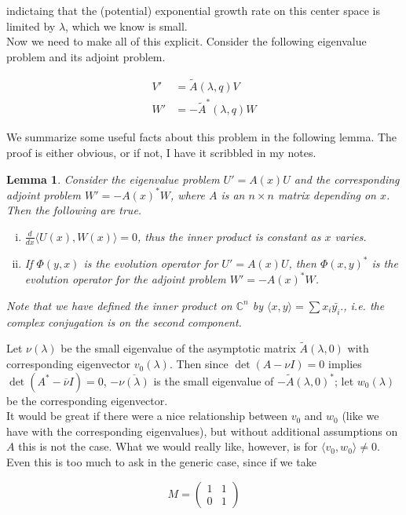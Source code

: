 \documentclass[12pt]{article}
\def\C{{\mathbb C}}
\newtheorem{lemma}{Lemma}
\begin{document}
indictaing that the (potential) exponential growth rate on this center space is limited by $\lambda$, which we know is small.\\

Now we need to make all of this explicit. Consider the following eigenvalue problem and its adjoint problem.

\begin{align}
V' &= \tilde{A}(\lambda, q)V \label{eig:V} \\
W' &= -\tilde{A}^*(\lambda, q)W \label{eig:W}
\end{align}

We summarize some useful facts about this problem in the following lemma. The proof is either obvious, or if not, I have it scribbled in my notes.

\begin{lemma}\label{eigadjoint}
Consider the eigenvalue problem $U' = A(x)U$ and the corresponding adjoint problem $W' = -A(x)^* W$, where $A$ is an $n \times n$ matrix depending on $x$. Then the following are true.
\begin{enumerate}[(i)]
\item $\frac{d}{dx}\langle U(x), W(x) \rangle = 0$, thus the inner product is constant as $x$ varies.
\item If $\Phi(y, x)$ is the evolution operator for $U' = A(x)U$, then $\Phi(x, y)^*$ is the evolution operator for the adjoint problem $W' = -A(x)^* W$.
\end{enumerate}
Note that we have defined the inner product on $\C^n$ by $\langle x, y \rangle = \sum x_i \bar{y_i}.$, i.e. the complex conjugation is on the second component.
\end{lemma}

Let $\nu(\lambda)$ be the small eigenvalue of the asymptotic matrix $\tilde{A}(\lambda,0)$ with corresponding eigenvector $v_0(\lambda)$. Then since $\det(A - \nu I) = 0$ implies $\det(A^* - \overline{\nu}I) = 0$, $-\overline{\nu(\lambda)}$ is the small eigenvalue of $-\tilde{A}(\lambda,0)^*$; let $w_0(\lambda)$ be the corresponding eigenvector.\\

It would be great if there were a nice relationship between $v_0$ and $w_0$ (like we have with the corresponding eigenvalues), but without additional assumptions on $A$ this is not the case. What we would really like, however, is for $\langle v_0, w_0 \rangle \neq 0$. Even this is too much to ask in the generic case, since if we take

\[
M = \begin{pmatrix}1 & 1 \\ 0 & 1 \end{pmatrix}
\]
\end{document}
